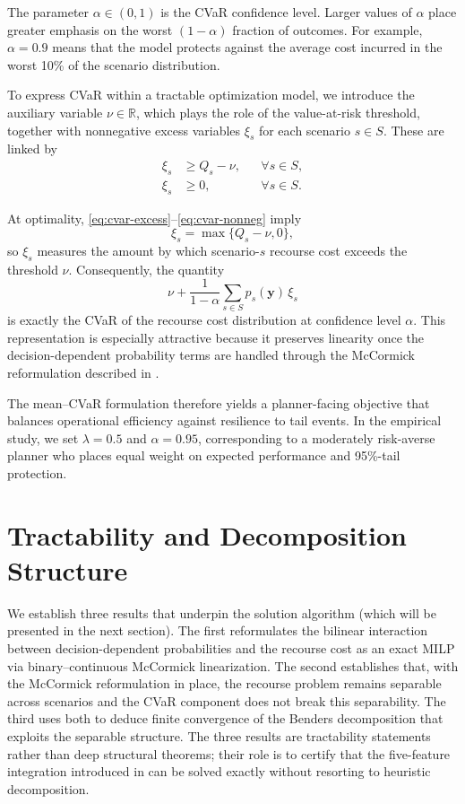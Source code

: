 \documentclass[final,3p,authoryear]{elsarticle}
\theoremstyle{definition}
\begin{document}
The parameter $\alpha \in (0,1)$ is the CVaR confidence level. Larger
values of $\alpha$ place greater emphasis on the worst $(1-\alpha)$
fraction of outcomes. For example, $\alpha = 0.9$ means that the model
protects against the average cost incurred in the worst 10\% of the
scenario distribution.

To express CVaR within a tractable optimization model, we introduce the
auxiliary variable $\nu \in \mathbb R$, which plays the role of the
value-at-risk threshold, together with nonnegative excess variables
$\xi_s$ for each scenario $s \in S$. These are linked by
\begin{align}
\xi_s &\ge Q_s - \nu, && \forall s \in S,
\label{eq:cvar-excess} \\
\xi_s &\ge 0, && \forall s \in S.
\label{eq:cvar-nonneg}
\end{align}

At optimality, \eqref{eq:cvar-excess}--\eqref{eq:cvar-nonneg} imply
\[
\xi_s = \max\{Q_s-\nu,0\},
\]
so $\xi_s$ measures the amount by which scenario-$s$ recourse cost
exceeds the threshold $\nu$. Consequently, the quantity
\[
\nu + \frac{1}{1-\alpha}\sum_{s \in S} p_s(\mathbf y)\,\xi_s
\]
is exactly the CVaR of the recourse cost distribution at confidence level
$\alpha$. This representation is especially attractive because it
preserves linearity once the decision-dependent probability terms are
handled through the McCormick reformulation described in
.

The mean--CVaR formulation therefore yields a planner-facing objective
that balances operational efficiency against resilience to tail events.
In the empirical study, we set $\lambda = 0.5$ and $\alpha = 0.95$,
corresponding to a moderately risk-averse planner who places equal
weight on expected performance and 95\%-tail protection.


\section{Tractability and Decomposition Structure}
\label{sec:structural}


We establish three results that underpin the solution algorithm (which will be presented in the next section). The
first reformulates the bilinear interaction between decision-dependent
probabilities and the recourse cost as an exact MILP via
binary--continuous McCormick linearization. The second establishes
that, with the McCormick reformulation in place, the recourse problem
remains separable across scenarios and the CVaR component does not
break this separability. The third uses both to deduce finite
convergence of the Benders decomposition that exploits the separable
structure. The three results are tractability statements rather than
deep structural theorems; their role is to certify that the
five-feature integration introduced in  can be solved
exactly without resorting to heuristic decomposition.
\end{document}
